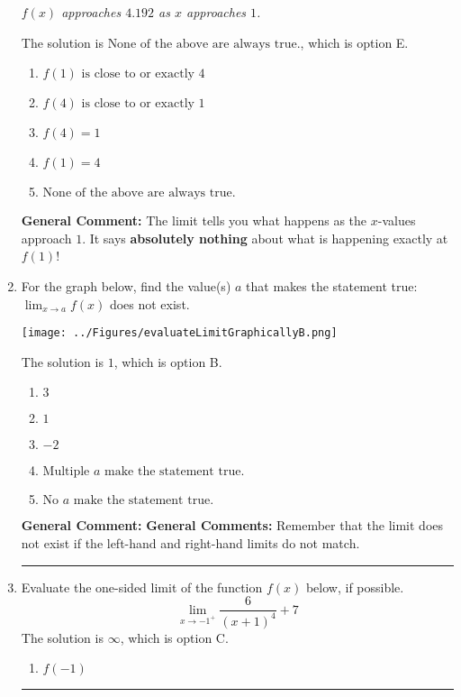 \documentclass{extbook}[14pt]
\newcommand{\litem}[1]{\item #1

\rule{\textwidth}{0.4pt}}
\begin{document}
\begin{enumerate}
{\begin{center}
    \textit{ $f(x)$ approaches $4.192$ as $x$ approaches $1$. }
\end{center}
The solution is \( \text{None of the above are always true.} \), which is option E.\begin{enumerate}[label=\Alph*.]
\item \( f(1) \text{ is close to or exactly } 4 \)


\item \( f(4) \text{ is close to or exactly } 1 \)


\item \( f(4) = 1 \)


\item \( f(1) = 4 \)


\item \( \text{None of the above are always true.} \)


\end{enumerate}

\textbf{General Comment:} The limit tells you what happens as the $x$-values approach $1$. It says \textbf{absolutely nothing} about what is happening exactly at $f(1)$!
}
\litem{
For the graph below, find the value(s) $a$ that makes the statement true: $ \displaystyle \lim_{x \rightarrow a} f(x)$ does not exist.

\begin{center}
    \texttt{[image: ../Figures/evaluateLimitGraphicallyB.png]}
\end{center}


The solution is \( 1 \), which is option B.\begin{enumerate}[label=\Alph*.]
\item \( 3 \)


\item \( 1 \)


\item \( -2 \)


\item \( \text{Multiple } a \text{ make the statement true}. \)


\item \( \text{No } a \text{ make the statement true}. \)


\end{enumerate}

\textbf{General Comment:} \textbf{General Comments:} Remember that the limit does not exist if the left-hand and right-hand limits do not match.
}
\litem{
Evaluate the one-sided limit of the function $f(x)$ below, if possible.
\[ \lim_{x \rightarrow -1^+} \frac{6}{(x+1)^4}+7 \]The solution is \( \infty \), which is option C.\begin{enumerate}[label=\Alph*.]
\item \( f(-1) \)



\end{enumerate}}
\end{enumerate}
\end{document}
